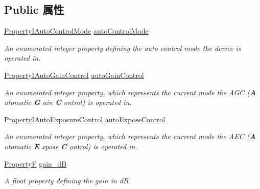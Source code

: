 \subsection*{Public 属性}
\begin{DoxyCompactItemize}
\item 
\hyperlink{group___device_specific_interface_ga692ee7a4c1a557177eba5b66deed4c2d}{Property\+I\+Auto\+Control\+Mode} \hyperlink{classmv_i_m_p_a_c_t_1_1acquire_1_1_camera_settings_blue_device_a4332b415ee1aa70f66f1c229f2149f71}{auto\+Control\+Mode}
\begin{DoxyCompactList}\small\item\em An enumerated integer property defining the auto control mode the device is operated in. \end{DoxyCompactList}\item 
\hyperlink{group___device_specific_interface_ga6489a23af699da0b3a1f151c966ab906}{Property\+I\+Auto\+Gain\+Control} \hyperlink{classmv_i_m_p_a_c_t_1_1acquire_1_1_camera_settings_blue_device_a9d65d62f763438188309c1807b7fc436}{auto\+Gain\+Control}
\begin{DoxyCompactList}\small\item\em An enumerated integer property, which represents the current mode the A\+G\+C ({\bfseries A} utomatic {\bfseries G} ain {\bfseries C} ontrol) is operated in. \end{DoxyCompactList}\item 
\hyperlink{group___device_specific_interface_ga5223682df43da3c6e83d7c8382189d7c}{Property\+I\+Auto\+Exposure\+Control} \hyperlink{classmv_i_m_p_a_c_t_1_1acquire_1_1_camera_settings_blue_device_a42cf7abb4f526ee88e74e040a3c9c3ba}{auto\+Expose\+Control}
\begin{DoxyCompactList}\small\item\em An enumerated integer property, which represents the current mode the A\+E\+C ({\bfseries A} utomatic {\bfseries E} xpose {\bfseries C} ontrol) is operated in. \end{DoxyCompactList}\item 
\hyperlink{group___common_interface_gaf54865fe5a3d5cfd15f9a111b40d09f9}{Property\+F} \hyperlink{classmv_i_m_p_a_c_t_1_1acquire_1_1_camera_settings_blue_device_a670966b0117c0fbf623d169e9ee69431}{gain\+\_\+d\+B}
\begin{DoxyCompactList}\small\item\em A float property defining the gain in d\+B. \end{DoxyCompactList}\item 

\end{DoxyCompactItemize}
